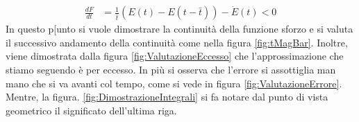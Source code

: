 \begin{description}
\begin{equation}
\begin{split}
\frac{dF}{dt} &= \frac{1}{\bar{t}}\left(E(t)-E(t-\bar{t})\right)-\dot{E}(t)<0
\end{split}
\end{equation}
In questo p[unto si vuole dimostrare la continuità della funzione sforzo e si valuta il successivo andamento della continuità come nella figura \ref{fig:tMagBar}.
Inoltre, viene dimostrata dalla figura \ref{fig:ValutazioneEccesso} che l'approssimazione che stiamo seguendo è per eccesso.
In più si osserva che l'errore si assottiglia man mano che si va avanti col tempo, come si vede in figura \ref{fig:ValutazioneErrore}.
Mentre, la figura. \ref{fig:DimostrazioneIntegrali} si fa notare dal punto di vista geometrico il significato dell'ultima riga.
\end{description}

\begin{figure}
\centering
{}\quad
{}\\
\quad

\end{figure}

